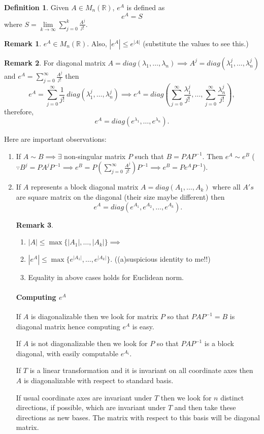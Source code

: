 \documentclass[12pt,reqno]{amsart}
\theoremstyle{plain}
\theoremstyle{definition}
\newtheorem{defn}{Definition}
\newtheorem{rem}{Remark}
\begin{document}
\begin{defn}
    Given $A \in M_n(\mathbb{R})$, $e^A$ is defined as
    $$ e^A = S$$ where $S = \lim\limits_{k \to \infty} \sum\limits_{j = 0}^k \frac{A^j}{j!}.$
\end{defn}
\begin{rem}
    $e^A \in M_n(\mathbb{R})$. Also, $|e^A| \leq e^{|A|}$ (substitute the values to see this.)
\end{rem}
\begin{rem}
    For diagonal matrix $A = diag(\lambda_1, \dots, \lambda_n) \implies A^j = diag(\lambda_1^j, \dots, \lambda_n^j)$ and $e^A = \sum\limits_{j=0}^{\infty}\frac{A^j}{j!}$ then 
    $$e^A = \sum\limits_{j=0}^{\infty}\frac{1}{j!}~diag(\lambda_1^j, \dots, \lambda_n^j) \implies e^A = diag(\sum\limits_{j=0}^{\infty}\frac{\lambda_1^j}{j!}, \dots, \sum\limits_{j=0}^{\infty}\frac{\lambda_n^j}{j!}),$$ therefore, 
    $$e^A = diag(e^{\lambda_1}, \dots, e^{\lambda_n}).$$
\end{rem}
Here are important observations:
\begin{enumerate}
    \item If $A \sim B \implies \exists$ non-singular matrix $P$ such that $B = PAP^{-1}$. Then $e^A \sim e^B$ ($\because B^j = PA^jP^{-1} \implies e^B = P\left(\sum\limits_{j=0}^{\infty}\frac{A^j}{j!}\right) P^{-1} \implies e^B = Pe^AP^{-1}$).
    \item If $A$ represents a block diagonal matrix $ A = diag(A_1, \dots, A_k)$ where all $A's$ are square matrix on the diagonal (their size maybe different) then 
    $$ e^A = diag(e^{A_1},e^{A_2}, \dots, e^{A_k}).$$
    \begin{rem}
        \begin{enumerate}
            \item $|A| \leq \max\{|A_1|, \dots, |A_k|\} \implies$
            \item $|e^A| \leq \max\{e^{|A_1|}, \dots, e^{|A_k|}\}.$ ((a)suspicious identity to me!!)
            \item Equality in above cases holds for Euclidean norm.
        \end{enumerate}
    \end{rem}
    \paragraph{\bf Computing $e^A$} If $A$ is diagonalizable then we look for matrix $P$ so that $PAP^{-1} = B$ is diagonal matrix hence computing $e^A$ is easy.\par
    If $A$ is not diagonalizable then we look for $P$ so that $PAP^{-1}$ is a block diagonal, with easily computable $e^{A_i}$.
    \par If $T$ is a linear transformation and it is invariant on all coordinate axes then $A$ is diagonalizable with respect to standard basis.
    \par If usual coordinate axes are invariant under $T$ then we look for $n$ distinct directions, if possible, which are invariant under $T$ and then take these directions as new bases. The matrix with respect to this basis will be diagonal matrix.
\end{enumerate}
\end{document}
